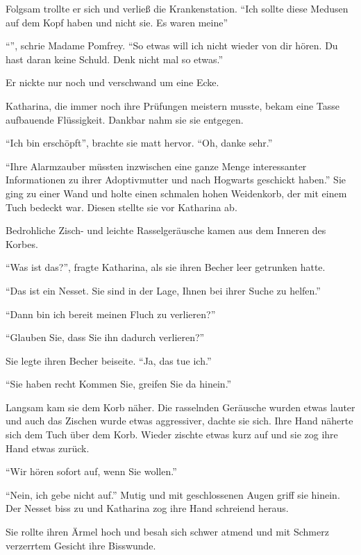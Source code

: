 Folgsam trollte er sich und verließ die Krankenstation. \enquote{Ich sollte diese Medusen auf dem Kopf haben und nicht sie. Es waren meine\abs}

\enquote{}, schrie Madame Pomfrey. \enquote{So etwas will ich nicht wieder von dir hören. Du hast daran keine Schuld. Denk nicht mal so etwas.}

Er nickte nur noch und verschwand um eine Ecke.

Katharina, die immer noch ihre Prüfungen meistern musste, bekam eine Tasse aufbauende Flüssigkeit. Dankbar nahm sie sie entgegen.

\enquote{Ich bin erschöpft}, brachte sie matt hervor. \enquote{Oh, danke sehr.}

\enquote{Ihre Alarmzauber müssten inzwischen eine ganze Menge interessanter Informationen zu ihrer Adoptivmutter und nach Hogwarts geschickt haben.} Sie ging zu einer Wand und holte einen schmalen hohen Weidenkorb, der mit einem Tuch bedeckt war. Diesen stellte sie vor Katharina ab.

Bedrohliche Zisch- und leichte Rasselgeräusche kamen aus dem Inneren des Korbes.

\enquote{Was ist das?}, fragte Katharina, als sie ihren Becher leer getrunken hatte.

\enquote{Das ist ein Nesset. Sie sind in der Lage, Ihnen bei ihrer Suche zu helfen.}

\enquote{Dann bin ich bereit meinen Fluch zu verlieren?}

\enquote{Glauben Sie, dass Sie ihn dadurch verlieren?}

Sie legte ihren Becher beiseite. \enquote{Ja, das tue ich.}

\enquote{Sie haben recht \gst Kommen Sie, greifen Sie da hinein.}

Langsam kam sie dem Korb näher. Die rasselnden Geräusche wurden etwas lauter und auch das Zischen wurde etwas aggressiver, dachte sie sich. Ihre Hand näherte sich dem Tuch über dem Korb. Wieder zischte etwas kurz auf und sie zog ihre Hand etwas zurück.

\enquote{Wir hören sofort auf, wenn Sie wollen.}

\enquote{Nein, ich gebe nicht auf.} Mutig und mit geschlossenen Augen griff sie hinein. Der Nesset biss zu und Katharina zog ihre Hand schreiend heraus.

Sie rollte ihren Ärmel hoch und besah sich schwer atmend und mit Schmerz verzerrtem Gesicht ihre Bisswunde.

